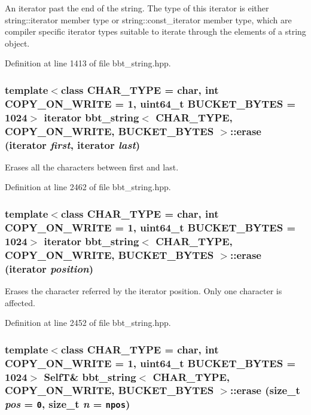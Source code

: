 An iterator past the end of the string. The type of this iterator is either string::iterator member type or string::const\_\-iterator member type, which are compiler specific iterator types suitable to iterate through the elements of a string object. 

Definition at line 1413 of file bbt\_\-string.hpp.\hypertarget{classbbt__string_095d97e82bab15718a353ab0f9ec3a4f}{
\subsubsection[{erase}]{\setlength{\rightskip}{0pt plus 5cm}template$<$class CHAR\_\-TYPE  = char, int COPY\_\-ON\_\-WRITE = 1, uint64\_\-t BUCKET\_\-BYTES = 1024$>$ iterator {\bf bbt\_\-string}$<$ CHAR\_\-TYPE, COPY\_\-ON\_\-WRITE, BUCKET\_\-BYTES $>$::erase (iterator {\em first}, \/  iterator {\em last})}}
\label{classbbt__string_095d97e82bab15718a353ab0f9ec3a4f}


Erases all the characters between first and last. 

Definition at line 2462 of file bbt\_\-string.hpp.\hypertarget{classbbt__string_5eac694c7f6e44c5018993eba8153e33}{
\subsubsection[{erase}]{\setlength{\rightskip}{0pt plus 5cm}template$<$class CHAR\_\-TYPE  = char, int COPY\_\-ON\_\-WRITE = 1, uint64\_\-t BUCKET\_\-BYTES = 1024$>$ iterator {\bf bbt\_\-string}$<$ CHAR\_\-TYPE, COPY\_\-ON\_\-WRITE, BUCKET\_\-BYTES $>$::erase (iterator {\em position})}}
\label{classbbt__string_5eac694c7f6e44c5018993eba8153e33}


Erases the character referred by the iterator position. Only one character is affected. 

Definition at line 2452 of file bbt\_\-string.hpp.\hypertarget{classbbt__string_21d1419fbc55b6276cb15a62b513106d}{
\subsubsection[{erase}]{\setlength{\rightskip}{0pt plus 5cm}template$<$class CHAR\_\-TYPE  = char, int COPY\_\-ON\_\-WRITE = 1, uint64\_\-t BUCKET\_\-BYTES = 1024$>$ {\bf SelfT}\& {\bf bbt\_\-string}$<$ CHAR\_\-TYPE, COPY\_\-ON\_\-WRITE, BUCKET\_\-BYTES $>$::erase (size\_\-t {\em pos} = {\tt 0}, \/  size\_\-t {\em n} = {\tt npos})}}
\label{classbbt__string_21d1419fbc55b6276cb15a62b513106d}


